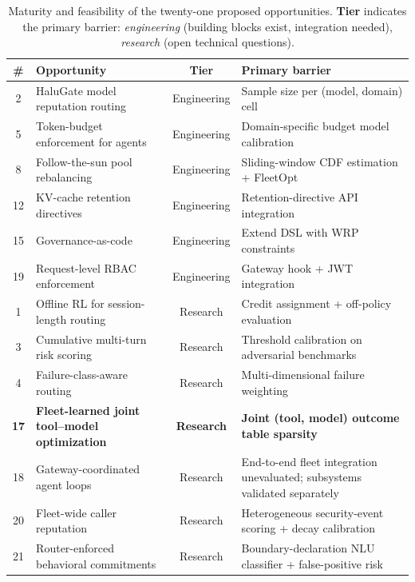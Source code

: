 \begin{table}[t]
\centering
\caption{Maturity and feasibility of the twenty-one proposed
opportunities.  \textbf{Tier} indicates the primary barrier:
\emph{engineering} (building blocks exist, integration needed),
\emph{research} (open technical questions).}
\label{tab:maturity}
\small
\renewcommand{\arraystretch}{1.15}
\begin{tabularx}{\textwidth}{c l c X}
\toprule
\textbf{\#} & \textbf{Opportunity} & \textbf{Tier} & \textbf{Primary barrier} \\
\midrule
\rowcolor{routergreen!8}
2  & HaluGate model reputation routing    & Engineering & Sample size per (model, domain) cell \\
5  & Token-budget enforcement for agents   & Engineering & Domain-specific budget model calibration \\
\rowcolor{routergreen!8}
8  & Follow-the-sun pool rebalancing       & Engineering & Sliding-window CDF estimation + FleetOpt \\
12 & KV-cache retention directives         & Engineering & Retention-directive API integration \\
\rowcolor{routergreen!8}
15 & Governance-as-code                    & Engineering & Extend DSL with WRP constraints \\
19 & Request-level RBAC enforcement         & Engineering & Gateway hook + JWT integration \\
\midrule
\rowcolor{poolorange!8}
1  & Offline RL for session-length routing  & Research & Credit assignment + off-policy evaluation \\
3  & Cumulative multi-turn risk scoring     & Research & Threshold calibration on adversarial benchmarks \\
\rowcolor{poolorange!8}
4  & Failure-class-aware routing            & Research & Multi-dimensional failure weighting \\
\textbf{17} & \textbf{Fleet-learned joint tool--model optimization} & \textbf{Research} & \textbf{Joint (tool, model) outcome table sparsity} \\
\rowcolor{poolorange!8}
18 & Gateway-coordinated agent loops       & Research & End-to-end fleet integration unevaluated; subsystems validated separately \\
\rowcolor{poolorange!8}
20 & Fleet-wide caller reputation           & Research & Heterogeneous security-event scoring + decay calibration \\
21 & Router-enforced behavioral commitments & Research & Boundary-declaration NLU classifier + false-positive risk \\

\end{tabularx}
\end{table}

